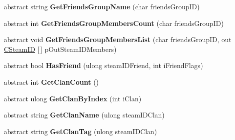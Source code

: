 \begin{DoxyCompactItemize}
abstract string {\bfseries Get\+Friends\+Group\+Name} (char friends\+Group\+ID)
\item 
\mbox{\label{class_valve_1_1_steamworks_1_1_i_steam_friends_a83928a360cdf48bd8472761a9931d520}} 
abstract int {\bfseries Get\+Friends\+Group\+Members\+Count} (char friends\+Group\+ID)
\item 
\mbox{\label{class_valve_1_1_steamworks_1_1_i_steam_friends_af2a453d029637f2d9db979fbf74d67d7}} 
abstract void {\bfseries Get\+Friends\+Group\+Members\+List} (char friends\+Group\+ID, out \hyperlink{struct_valve_1_1_steamworks_1_1_c_steam_i_d}{C\+Steam\+ID} \mbox{[}$\,$\mbox{]} p\+Out\+Steam\+I\+D\+Members)
\item 
\mbox{\label{class_valve_1_1_steamworks_1_1_i_steam_friends_a347783cfd787b87c2a5ea38970d5e2cf}} 
abstract bool {\bfseries Has\+Friend} (ulong steam\+I\+D\+Friend, int i\+Friend\+Flags)
\item 
\mbox{\label{class_valve_1_1_steamworks_1_1_i_steam_friends_a7114851cb4056d53174692849284dc75}} 
abstract int {\bfseries Get\+Clan\+Count} ()
\item 
\mbox{\label{class_valve_1_1_steamworks_1_1_i_steam_friends_ab4858b4db63ccb5b88657845f3a0c40d}} 
abstract ulong {\bfseries Get\+Clan\+By\+Index} (int i\+Clan)
\item 
\mbox{\label{class_valve_1_1_steamworks_1_1_i_steam_friends_abe32d4da4594a32b33732688c866962d}} 
abstract string {\bfseries Get\+Clan\+Name} (ulong steam\+I\+D\+Clan)
\item 
\mbox{\label{class_valve_1_1_steamworks_1_1_i_steam_friends_a08c6d8671faafbdca60b3102345c4187}} 
abstract string {\bfseries Get\+Clan\+Tag} (ulong steam\+I\+D\+Clan)
\item 
\mbox{\label{class_valve_1_1_steamworks_1_1_i_steam_friends_a328ca7b0661384c05154e79b9818e7b8}} 

\end{DoxyCompactItemize}
